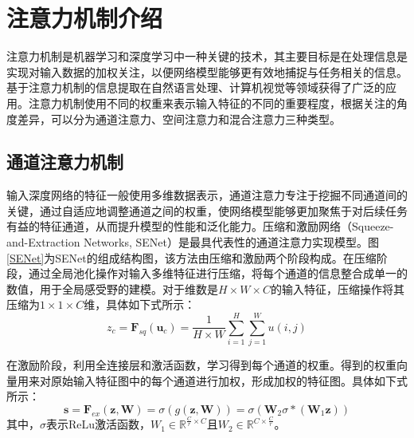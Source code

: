 


\section{注意力机制介绍}
\label{sec:sce3_1}
注意力机制是机器学习和深度学习中一种关键的技术，其主要目标是在处理信息是实现对输入数据的加权关注，以便网络模型能够更有效地捕捉与任务相关的信息。基于注意力机制的信息提取在自然语言处理、计算机视觉等领域获得了广泛的应用。注意力机制使用不同的权重来表示输入特征的不同的重要程度，根据关注的角度差异，可以分为通道注意力、空间注意力和混合注意力三种类型。
\subsection{通道注意力机制}
输入深度网络的特征一般使用多维数据表示，通道注意力专注于挖掘不同通道间的关键，通过自适应地调整通道之间的权重，使网络模型能够更加聚焦于对后续任务有益的特征通道，从而提升模型的性能和泛化能力。压缩和激励网络（Squeeze-and-Extraction Networks, SENet）是最具代表性的通道注意力实现模型。图\ref{SENet}为SENet的组成结构图，该方法由压缩和激励两个阶段构成。在压缩阶段，通过全局池化操作对输入多维特征进行压缩，将每个通道的信息整合成单一的数值，用于全局感受野的建模。对于维数是$H\times W \times C$的输入特征，压缩操作将其压缩为$1 \times 1 \times C$维，具体如下式所示：
\begin{equation}
    z_c=\mathbf{F}_{sq}\left( \mathbf{u}_c \right) =\frac{1}{H\times W}\sum_{i=1}^H{\sum_{j=1}^W{u\left( i,j \right)}}
\end{equation}

在激励阶段，利用全连接层和激活函数，学习得到每个通道的权重。得到的权重向量用来对原始输入特征图中的每个通道进行加权，形成加权的特征图。具体如下式所示：
\begin{equation}
    \mathbf{s}=\mathbf{F}_{ex}\left( \mathbf{z},\mathbf{W} \right) =\sigma \left( g\left( \mathbf{z},\mathbf{W} \right) \right) =\sigma \left( \mathbf{W}_2\sigma *\left( \mathbf{W}_1\mathbf{z} \right) \right)
\end{equation}
其中，$\sigma$表示ReLu激活函数，$W_1 \in \mathbb{R}^{\frac{C}{r}\times C}$且$W_2 \in \mathbb{R}^{C \times \frac{C}{r}}$。

